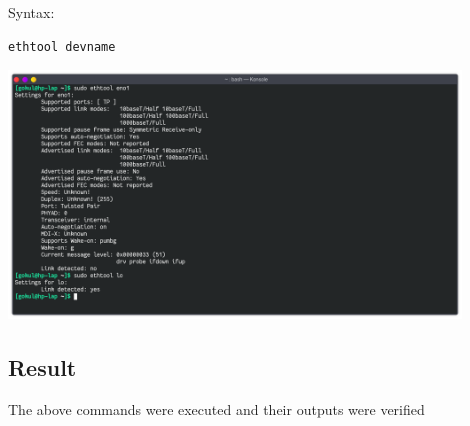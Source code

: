 Syntax:
\begin{lstlisting}
ethtool devname
\end{lstlisting}

\begin{center}
	\includegraphics[width=0.90\textwidth]{img/p1/ss11.png}
\end{center}

\subsection{Result}
The above commands were executed and their outputs were verified